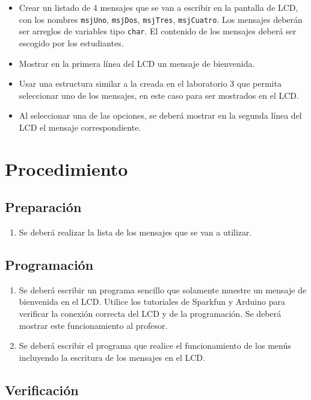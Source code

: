 \documentclass[12pt,letterpaper]{IEEEtran}
\begin{document}
\begin{itemize}
	\item Crear un listado de 4 mensajes que se van a escribir en la pantalla de LCD, con los nombres \texttt{msjUno}, \texttt{msjDos}, \texttt{msjTres}, \texttt{msjCuatro}. Los mensajes deberán ser arreglos de variables tipo \texttt{char}. El contenido de los mensajes deberá ser escogido por los estudiantes.
    \item Mostrar en la primera línea del LCD un mensaje de bienvenida.
    \item Usar una estructura similar a la creada en el laboratorio 3 que permita seleccionar uno de los mensajes, en este caso para ser mostrados en el LCD.
    \item Al seleccionar una de las opciones, se deberá mostrar en la segunda línea del LCD el mensaje correspondiente.
\end{itemize}

\section{Procedimiento}


\subsection{Preparación}

\begin{enumerate}
	\item Se deberá realizar la lista de los mensajes que se van a utilizar.
\end{enumerate}


\subsection{Programación}

\begin{enumerate}[resume]
    \item Se deberá escribir un programa sencillo que solamente muestre un mensaje de bienvenida en el LCD. Utilice los tutoriales de Sparkfun y Arduino para verificar la conexión correcta del LCD y de la programación. Se deberá mostrar este funcionamiento al profesor.
    \item Se deberá escribir el programa que realice el funcionamiento de los menús incluyendo la escritura de los mensajes en el LCD. 
\end{enumerate}

\subsection{Verificación}
\end{document}
